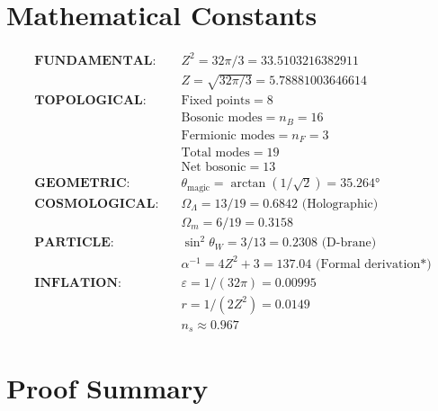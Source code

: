 \documentclass[12pt,a4paper]{article}
\newcommand{\OmegaL}{\Omega_\Lambda}
\newcommand{\OmegaM}{\Omega_m}
\newcommand{\sinW}{\sin^2\theta_W}
\newcommand{\nB}{n_B}
\newcommand{\nF}{n_F}
\newcommand{\Zsq}{Z^2}
\begin{document}
\appendix

\section{Mathematical Constants}

\begin{align}
\textbf{FUNDAMENTAL:} \quad & \Zsq = 32\pi/3 = 33.5103216382911 \\
& Z = \sqrt{32\pi/3} = 5.78881003646614 \\[1em]
\textbf{TOPOLOGICAL:} \quad & \text{Fixed points} = 8 \\
& \text{Bosonic modes} = \nB = 16 \\
& \text{Fermionic modes} = \nF = 3 \\
& \text{Total modes} = 19 \\
& \text{Net bosonic} = 13 \\[1em]
\textbf{GEOMETRIC:} \quad & \theta_{\text{magic}} = \arctan(1/\sqrt{2}) = 35.264° \\[1em]
\textbf{COSMOLOGICAL:} \quad & \OmegaL = 13/19 = 0.6842 \text{ (Holographic)} \\
& \OmegaM = 6/19 = 0.3158 \\[1em]
\textbf{PARTICLE:} \quad & \sinW = 3/13 = 0.2308 \text{ (D-brane)} \\
& \alpha^{-1} = 4\Zsq + 3 = 137.04 \text{ (Formal derivation*)} \\[1em]
\textbf{INFLATION:} \quad & \varepsilon = 1/(32\pi) = 0.00995 \\
& r = 1/(2\Zsq) = 0.0149 \\
& n_s \approx 0.967
\end{align}

\section{Proof Summary}
\end{document}
